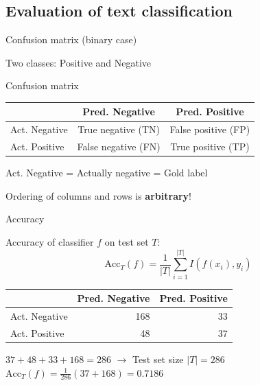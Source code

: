 \documentclass[12pt,aspectratio=169,handout]{beamer}
\begin{document}
\subsection{Evaluation of text classification}


\begin{frame}{Confusion matrix (binary case)}

Two classes: Positive and Negative

\begin{block}{Confusion matrix}
\begin{tabular}{l|cc}
& Pred. Negative & Pred. Positive \\ \toprule
Act. Negative & True negative (TN) & False positive (FP) \\
Act. Positive & False negative (FN) & True positive (TP) \\
\end{tabular}
\end{block}

\bigskip

Act. Negative = Actually negative = Gold label

Ordering of columns and rows is \textbf{arbitrary}!

\end{frame}


\begin{frame}{Accuracy}

Accuracy of classifier $f$ on test set $T$:
$$
\mathrm{Acc}_T(f) = \frac{1}{|T|} \sum_{i = 1}^{|T|} I (f(x_i), y_i)
$$
	
\begin{example}
	\begin{tabular}{l|rr}
		& Pred. Negative & Pred. Positive \\ \toprule
		Act. Negative & 168 & 33 \\
		Act. Positive & 48 & 37 \\
	\end{tabular}
\end{example}

$37 + 48 + 33 + 168 = 286$ $\to$ Test set size $|T| = 286$
$\mathrm{Acc}_T(f) = \frac{1}{286} (37 + 168) = 0.7186$

	
\end{frame}
\end{document}
